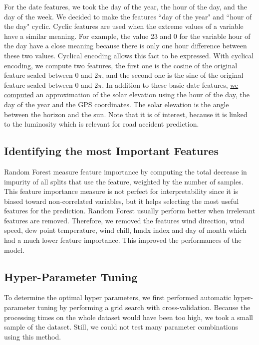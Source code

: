 \documentclass[conference]{IEEEtran}
\begin{document}
For the date features, we took the day of the year, the hour of the day,
and the day of the week. We decided to make the features ``day of the year"
and ``hour of the day" cyclic. Cyclic features are used when the extreme values
of a variable have a similar meaning. For example, the value 23 and 0 for
the variable hour of the day have a close meaning because there is only one
hour difference between these two values. Cyclical encoding allows this fact to be expressed.
With cyclical encoding, we compute two features, the first one is
the cosine of the original feature scaled between 0 and 2$\pi$, and the second
one is the sine of the original feature scaled between 0 and 2$\pi$.
In addition to these basic date features, \href{https://github.com/big-data-lab-team/accident-prediction-montreal/blob/master/solar\_features.py}{we computed} an approximation
of the solar elevation using the hour of the day, the day of the year
and the GPS coordinates. The solar elevation is the angle 
between the horizon and the sun. Note that it is of interest, because it is
linked to the luminosity which is relevant for road accident prediction.

\subsection{Identifying the most Important Features}

Random Forest measure feature importance by computing the total
decrease in impurity of all splits that use the feature, weighted by the
number of samples. This feature importance measure is not perfect for
interpretability since it is biased toward non-correlated variables, but it
helps selecting the most useful features for the prediction. 
Random Forest usually perform better when irrelevant features are removed.
Therefore, we removed the features wind direction, wind speed, dew
point temperature, wind chill, hmdx index and day of month which had a
much lower feature importance. This improved the performances of the model.

\subsection{Hyper-Parameter Tuning}

To determine the optimal hyper parameters, we first performed
automatic hyper-parameter tuning by performing a grid search 
with cross-validation. Because the processing times on the whole dataset would
have been too high, we took a small sample of the dataset. Still, we could
not test many parameter combinations using this method.
\end{document}
